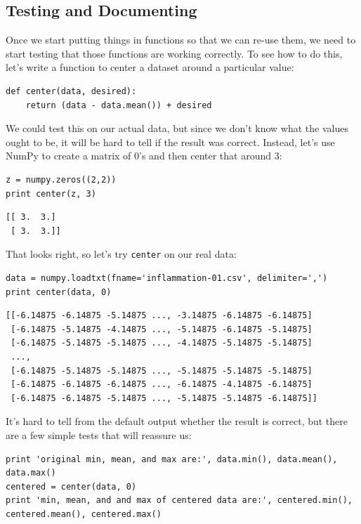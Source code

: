 \documentclass{book}
\begin{document}
\subsection{Testing and Documenting}

Once we start putting things in functions so that we can re-use them, we
need to start testing that those functions are working correctly. To see
how to do this, let's write a function to center a dataset around a
particular value:

\begin{verbatim}
def center(data, desired):
    return (data - data.mean()) + desired
\end{verbatim}

We could test this on our actual data, but since we don't know what the
values ought to be, it will be hard to tell if the result was correct.
Instead, let's use NumPy to create a matrix of 0's and then center that
around 3:

\begin{verbatim}
z = numpy.zeros((2,2))
print center(z, 3)
\end{verbatim}

\begin{verbatim}
[[ 3.  3.]
 [ 3.  3.]]
\end{verbatim}

That looks right, so let's try \texttt{center} on our real data:

\begin{verbatim}
data = numpy.loadtxt(fname='inflammation-01.csv', delimiter=',')
print center(data, 0)
\end{verbatim}

\begin{verbatim}
[[-6.14875 -6.14875 -5.14875 ..., -3.14875 -6.14875 -6.14875]
 [-6.14875 -5.14875 -4.14875 ..., -5.14875 -6.14875 -5.14875]
 [-6.14875 -5.14875 -5.14875 ..., -4.14875 -5.14875 -5.14875]
 ...,
 [-6.14875 -5.14875 -5.14875 ..., -5.14875 -5.14875 -5.14875]
 [-6.14875 -6.14875 -6.14875 ..., -6.14875 -4.14875 -6.14875]
 [-6.14875 -6.14875 -5.14875 ..., -5.14875 -5.14875 -6.14875]]
\end{verbatim}

It's hard to tell from the default output whether the result is correct,
but there are a few simple tests that will reassure us:

\begin{verbatim}
print 'original min, mean, and max are:', data.min(), data.mean(), data.max()
centered = center(data, 0)
print 'min, mean, and and max of centered data are:', centered.min(), centered.mean(), centered.max()
\end{verbatim}
\end{document}
